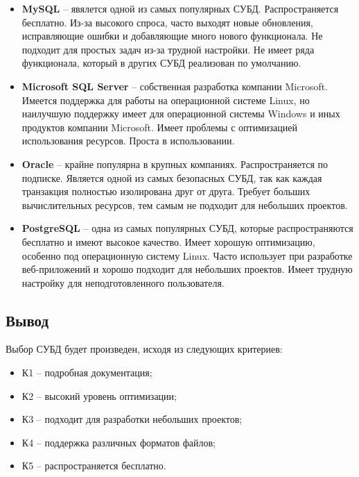 \begin{itemize}
    \item \textbf{MySQL} \cite{mysql} -- явялется одной из самых популярных СУБД. Распространяется бесплатно. Из-за высокого спроса, часто выходят новые обновления, исправляющие ошибки и добавляющие много нового функционала. Не подходит для простых задач из-за трудной настройки. Не имеет ряда функционала, который в других СУБД реализован по умолчанию.
    \item \textbf{Microsoft SQL Server} \cite{sqlserver} -- собственная разработка компании Microsoft. Имеется поддержка для работы на операционной системе Linux, но наилучшую поддержку имеет для операционной системы Windows и иных продуктов компании Microsoft. Имеет проблемы с оптимизацией использования ресурсов. Проста в использовании.

    \item \textbf{Oracle} \cite{oracle} -- крайне популярна в крупных компаниях. Распространяется по подписке. Является одной из самых безопасных СУБД, так как каждая транзакция полностью изолирована друг от друга. Требует больших вычислительных ресурсов, тем самым не подходит для небольших проектов.

    \item \textbf{PostgreSQL} \cite{postgres} -- одна из самых популярных СУБД, которые распространяются бесплатно и имеют высокое качество. Имеет хорошую оптимизацию, особенно под операционную систему Linux. Часто использует при разработке веб-приложений и хорошо подходит для небольших проектов. Имеет трудную настройку для неподготовленного пользователя.
\end{itemize}


\subsection{Вывод}

Выбор СУБД будет произведен, исходя из следующих критериев:

\begin{itemize}
    \item К1 -- подробная документация;
    \item К2 -- высокий уровень оптимизации;
    \item К3 -- подходит для разработки небольших проектов;
    \item К4 -- поддержка различных форматов файлов;
    \item К5 -- распространяется бесплатно.
\end{itemize}

